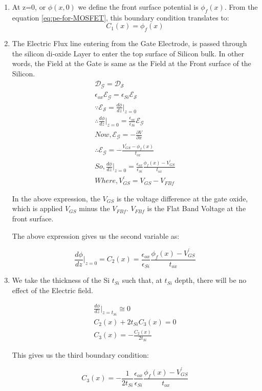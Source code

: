 \documentclass[a4paper]{article}
\begin{document}
\begin{enumerate}
\item At z=0, or $\phi(x,0)$ we define the front surface potential is $\phi_f(x)$. From the equation \ref{eq:pe-for-MOSFET}, this boundary condition translates to:
  \begin{equation}
    \label{eq:MOS-b-cond-1}
    C_1(x)=\phi_f(x)
  \end{equation}
\item The Electric Flux line entering from the Gate Electrode, is passed through the silicon di-oxide Layer to enter the top surface of Silicon bulk. In other words, the Field at the Gate is same as the Field at the Front surface of the Silicon.
  \begin{align*}
    \mathcal{D_{G}} = \mathcal{D_{S}}\\
    \epsilon_{ox} \mathcal{E_{G}} = \epsilon_{Si} \mathcal{E_{S}}\\
    \because \mathcal{E_{S}} = \frac{d\phi}{dz} \bigg\vert_{z=0}\\
    \therefore \frac{d\phi}{dz} \bigg\vert_{z=0} = \frac {\epsilon_{ox}} {\epsilon_{Si}} \mathcal{E_{G}}\\
    Now, \mathcal{E_{G}} = - \frac{\partial V}{\partial x}\\
    \therefore \mathcal{E_{G}} = - \frac{V_{GS}^{'} - \phi_f(x)}{t_{ox}}\\
    So, \frac{d\phi}{dz} \bigg\vert_{z=0} = \frac {\epsilon_{ox}} {\epsilon_{Si}} \frac{\phi_f(x) - V_{GS}^{'}}{t_{ox}}\\
    Where, V_{GS}^{'} = V_{GS} - V_{FBf}
  \end{align*}

In the above expression, the $V_{GS}$ is the voltage difference at the gate oxide, which is applied $V_{GS}$ minus the $V_{FBf}$. $V_{FBf}$ is the Flat Band Voltage at the front surface.

The above expression gives us the second variable as:

\begin{equation}
  \label{eq:MOS-b-cond-2}
  \frac{d\phi}{dz} \bigg\vert_{z=0} = C_2(x) = \frac {\epsilon_{ox}} {\epsilon_{Si}} \frac{\phi_f(x) - V_{GS}^{'}}{t_{ox}}
\end{equation}

\item We take the thickness of the Si $t_{Si}$ such that, at $t_{Si}$ depth, there will be no effect of the Electric field.

  \begin{align*}
    \frac{d\phi}{dz} \bigg\vert_{z=t_{Si}} \cong 0\\
    C_2(x) + 2t_{Si}C_3(x) = 0\\
    C_3(x) = - \frac{C_2(x)}{2t_{Si}}
  \end{align*}

  This gives us the third boundary condition:

  \begin{equation}
    \label{eq:MOS-b-cond-3}
    C_3(x) = -\frac{1}{2t_{Si}} \frac {\epsilon_{ox}} {\epsilon_{Si}} \frac{\phi_f(x) - V_{GS}^{'}}{t_{ox}}
  \end{equation}
\end{enumerate}
\end{document}
